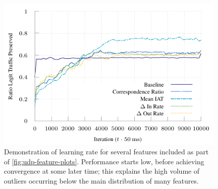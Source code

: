 \documentclass[conference, letterpaper, 10pt, times]{IEEEtran}
\begin{document}
\begin{figure}
	\centering
	\includegraphics[width=0.9\linewidth]{../plots/ftprep-good-2}
	\caption{
		Demonstration of learning rate for several features included as part of \cref{fig:udp-feature-plots}.
		Performance starts low, before achieving convergence at some later time; this explains the high volume of outliers occurring below the main distribution of many features.
		\label{fig:udp-fp-converge}
	}
\end{figure}

\end{document}
